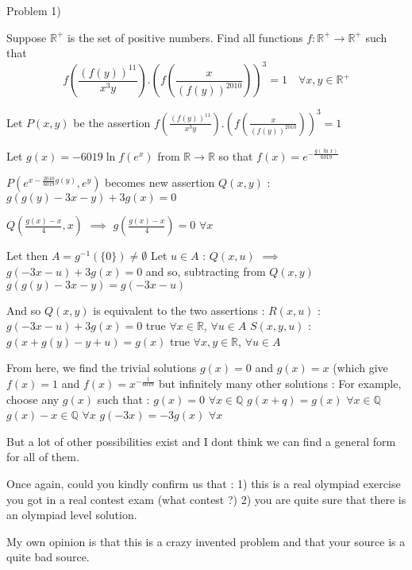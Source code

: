 \begin{solution}
	\begin{tcolorbox}\begin{bolded}Problem 1)\end{bolded}
 Suppose $\mathbb{R}^{+}$ is the set of positive numbers. 
Find all functions $f:\mathbb{R}^{+}\to\mathbb{R}^{+}$ such that
\[f\left(\frac{(f(y))^{11}}{x^3y}\right).\left(f(\frac{x}{(f(y))^{2010}})\right)^3=1\quad \forall x,y\in\mathbb{R}^+\]\end{tcolorbox}
Let $P(x,y)$ be the assertion $f\left(\frac{(f(y))^{11}}{x^3y}\right).\left(f(\frac{x}{(f(y))^{2010}})\right)^3=1$

Let $g(x)=-6019\ln f(e^x)$ from $\mathbb R\to\mathbb R$ so that $f(x)=e^{-\frac{g(\ln x)}{6019}}$ 

$P(e^{x-\frac{2010}{6019}g(y)},e^y)$ becomes new assertion $Q(x,y)$ : $g(g(y)-3x-y)+3g(x)=0$

$Q(\frac{g(x)-x}4,x)$ $\implies$ $g(\frac{g(x)-x}4)=0$ $\forall x$

Let then $A=g^{-1}(\{0\})\ne\emptyset$
Let $u\in A$ : $Q(x,u)$ $\implies$ $g(-3x-u)+3g(x)=0$ and so, subtracting from $Q(x,y)$ $g(g(y)-3x-y)=g(-3x-u)$

And so $Q(x,y)$ is equivalent to the two assertions :
$R(x,u)$ : $g(-3x-u)+3g(x)=0$ true $\forall x\in\mathbb R$, $\forall u\in A$
$S(x,y,u)$ : $g(x+g(y)-y+u)=g(x)$ true $\forall x,y\in\mathbb R$, $\forall u\in A$

From here, we find the trivial solutions $g(x)=0$ and $g(x)=x$ (which give $f(x)=1$ and $f(x)=x^{-\frac 1{6019}}$ but infinitely many other solutions :
For example, choose any $g(x)$ such that :
$g(x)=0$ $\forall x \in\mathbb Q$
$g(x+q)=g(x)$ $\forall x\in\mathbb Q$
$g(x)-x\in\mathbb Q$ $\forall x$
$g(-3x)=-3g(x)$ $\forall x$

But a lot of other possibilities exist and I dont think we can find a general form for all of them.

Once again, could you kindly confirm us that :
1) this is a real olympiad exercise you got in a real contest \/ exam (what contest ?)
2) you are quite sure that there is an olympiad level solution.

My own opinion is that this is a crazy invented problem and that your source is a quite bad source.
\end{solution}



